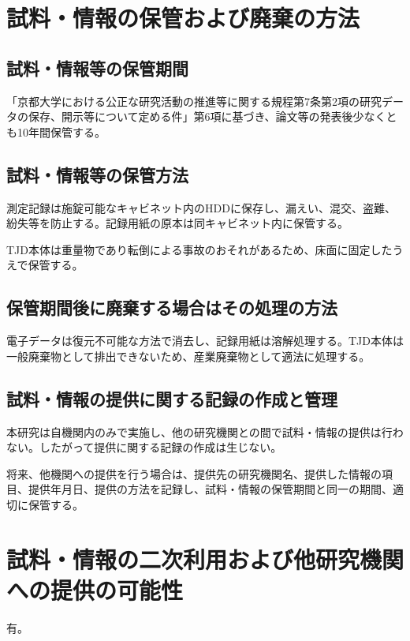 \documentclass{kyodai-protocol}
\begin{document}
\section{試料・情報の保管および廃棄の方法}
\label{sec:storage}

\subsection{試料・情報等の保管期間}

「京都大学における公正な研究活動の推進等に関する規程第7条第2項の研究データの保存、開示等について定める件」第6項に基づき、論文等の発表後少なくとも10年間保管する。

\subsection{試料・情報等の保管方法}

測定記録は施錠可能なキャビネット内のHDDに保存し、漏えい、混交、盗難、紛失等を防止する。記録用紙の原本は同キャビネット内に保管する。

TJD本体は重量物であり転倒による事故のおそれがあるため、床面に固定したうえで保管する。

\subsection{保管期間後に廃棄する場合はその処理の方法}

電子データは復元不可能な方法で消去し、記録用紙は溶解処理する。TJD本体は一般廃棄物として排出できないため、産業廃棄物として適法に処理する。

\subsection{試料・情報の提供に関する記録の作成と管理}

本研究は自機関内のみで実施し、他の研究機関との間で試料・情報の提供は行わない。したがって提供に関する記録の作成は生じない。

将来、他機関への提供を行う場合は、提供先の研究機関名、提供した情報の項目、提供年月日、提供の方法を記録し、試料・情報の保管期間と同一の期間、適切に保管する。

\section{試料・情報の二次利用および他研究機関への提供の可能性}
\label{sec:secondary-use}

有。
\end{document}
